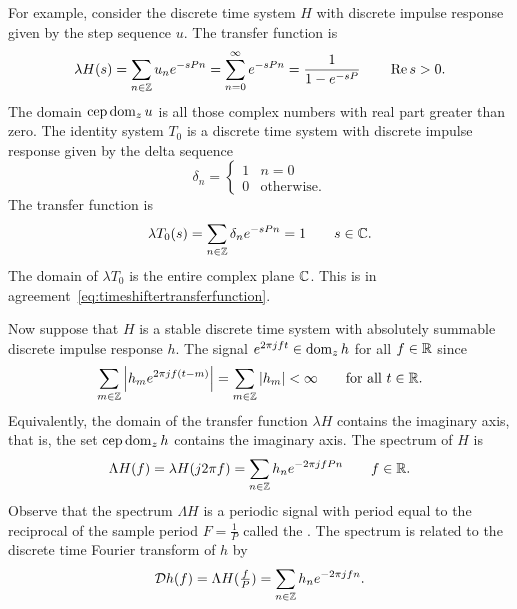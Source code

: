 For example, consider the discrete time system $H$ with discrete impulse response given by the step sequence $u$.  The transfer function is
\[
\lambda H(s) = \sum_{n \in {\mathbb Z}} u_n e^{-sPn} = \sum_{n = 0}^\infty e^{-sPn} = \frac{1}{1 - e^{-sP}} \qquad \operatorname{Re} s > 0.
\]
The domain $\operatorname{cep} \operatorname{dom}_z u$ is all those complex numbers with real part greater than zero.  The identity system $T_0$ is a discrete time system with discrete impulse response given by the delta sequence
\[
\delta_n = \begin{cases}
1 & n = 0 \\
0 & \text{otherwise}.
\end{cases}
\]  
The transfer function is 
\[
\lambda T_0(s) = \sum_{n \in {\mathbb Z}} \delta_n e^{-sPn} = 1 \qquad s \in {\mathbb C}.
\]
The domain of $\lambda T_0$ is the entire complex plane ${\mathbb C}$.  This is in agreement~\eqref{eq:timeshiftertransferfunction}.  %


Now suppose that $H$ is a stable discrete time system with absolutely summable discrete impulse response $h$.  The signal $e^{2\pi j f t} \in \operatorname{dom}_z h$ for all $f \in {\mathbb R}$ since
\[
\sum_{m \in {\mathbb Z}} \left\vert h_m e^{2\pi j f (t - m)} \right\vert = \sum_{m \in {\mathbb Z}} \left\vert h_m \right\vert < \infty \qquad \text{for all $t \in {\mathbb R}$}.
\]
Equivalently, the domain of the transfer function $\lambda H$ contains the imaginary axis, that is, the set $\operatorname{cep} \operatorname{dom}_z h$ contains the imaginary axis.  The spectrum of $H$ is
\[
\Lambda H(f) = \lambda H (j2\pi f) = \sum_{n \in {\mathbb Z}} h_n e^{-2\pi j f P n} \qquad f \in {\mathbb R}.
\]
Observe that the spectrum $\Lambda H$ is a periodic signal with period equal to the reciprocal of the sample period $F = \frac{1}{P}$ called the .  The spectrum is related to the discrete time Fourier transform of $h$ by
\[
{\mathcal D} h(f) = \Lambda H(\tfrac{f}{P}) =\sum_{n \in {\mathbb Z}} h_n e^{-2\pi j f n}.
\]

